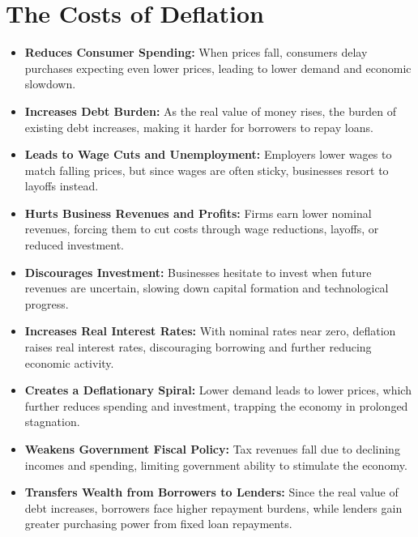 \documentclass[a4paper, 11pt]{article}
\begin{document}
\section{The Costs of Deflation}
\begin{itemize}
    \item \textbf{Reduces Consumer Spending:} When prices fall, consumers delay purchases expecting even lower prices, leading to lower demand and economic slowdown.
    \item \textbf{Increases Debt Burden:} As the real value of money rises, the burden of existing debt increases, making it harder for borrowers to repay loans.
    \item \textbf{Leads to Wage Cuts and Unemployment:} Employers lower wages to match falling prices, but since wages are often sticky, businesses resort to layoffs instead.
    \item \textbf{Hurts Business Revenues and Profits:} Firms earn lower nominal revenues, forcing them to cut costs through wage reductions, layoffs, or reduced investment.
    \item \textbf{Discourages Investment:} Businesses hesitate to invest when future revenues are uncertain, slowing down capital formation and technological progress.
    \item \textbf{Increases Real Interest Rates:} With nominal rates near zero, deflation raises real interest rates, discouraging borrowing and further reducing economic activity.
    \item \textbf{Creates a Deflationary Spiral:} Lower demand leads to lower prices, which further reduces spending and investment, trapping the economy in prolonged stagnation.
    \item \textbf{Weakens Government Fiscal Policy:} Tax revenues fall due to declining incomes and spending, limiting government ability to stimulate the economy.
    \item \textbf{Transfers Wealth from Borrowers to Lenders:} Since the real value of debt increases, borrowers face higher repayment burdens, while lenders gain greater purchasing power from fixed loan repayments.
\end{itemize}
\end{document}
